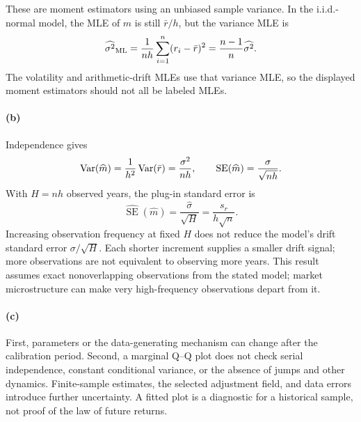 These are moment estimators using an unbiased sample variance. In the i.i.d.-normal model, the MLE of $m$ is still $\bar r/h$, but the variance MLE is
\[
 \widehat{\sigma^2}_{\rm ML}
 =\frac1{nh}\sum_{i=1}^n(r_i-\bar r)^2
 =\frac{n-1}{n}\widehat{\sigma^2}.
\]
The volatility and arithmetic-drift MLEs use that variance MLE, so the displayed moment estimators should not all be labeled MLEs.
\paragraph{(b)} Independence gives
\[
 \operatorname{Var}(\widehat m)=\frac1{h^2}\operatorname{Var}(\bar r)
 =\frac{\sigma^2}{nh},\qquad
 \operatorname{SE}(\widehat m)=\frac{\sigma}{\sqrt{nh}}.
\]
With $H=nh$ observed years, the plug-in standard error is
\[
 \widehat{\operatorname{SE}}(\widehat m)
 =\frac{\widehat\sigma}{\sqrt H}
 =\frac{s_r}{h\sqrt n}.
\]
Increasing observation frequency at fixed $H$ does not reduce the model's drift standard error $\sigma/\sqrt H$. Each shorter increment supplies a smaller drift signal; more observations are not equivalent to observing more years. This result assumes exact nonoverlapping observations from the stated model; market microstructure can make very high-frequency observations depart from it.
\paragraph{(c)} First, parameters or the data-generating mechanism can change after the calibration period. Second, a marginal Q--Q plot does not check serial independence, constant conditional variance, or the absence of jumps and other dynamics. Finite-sample estimates, the selected adjustment field, and data errors introduce further uncertainty. A fitted plot is a diagnostic for a historical sample, not proof of the law of future returns.
